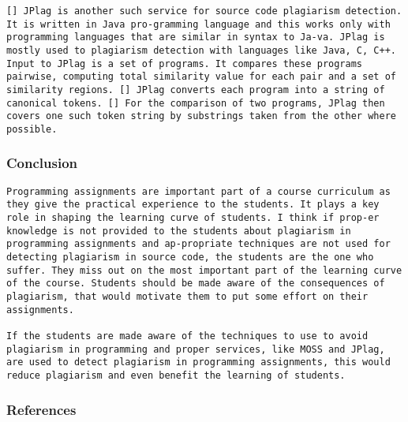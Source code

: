 \documentclass[a4paper]{article}
\begin{document}
\begin{verbatim}
[] JPlag is another such service for source code plagiarism detection. It is written in Java pro-gramming language and this works only with programming languages that are similar in syntax to Ja-va. JPlag is mostly used to plagiarism detection with languages like Java, C, C++. Input to JPlag is a set of programs. It compares these programs pairwise, computing total similarity value for each pair and a set of similarity regions. [] JPlag converts each program into a string of canonical tokens. [] For the comparison of two programs, JPlag then covers one such token string by substrings taken from the other where possible.
\end{verbatim}

\subsubsection{Conclusion}\label{conclusion}

\begin{verbatim}
Programming assignments are important part of a course curriculum as they give the practical experience to the students. It plays a key role in shaping the learning curve of students. I think if prop-er knowledge is not provided to the students about plagiarism in programming assignments and ap-propriate techniques are not used for detecting plagiarism in source code, the students are the one who suffer. They miss out on the most important part of the learning curve of the course. Students should be made aware of the consequences of plagiarism, that would motivate them to put some effort on their assignments.

If the students are made aware of the techniques to use to avoid plagiarism in programming and proper services, like MOSS and JPlag, are used to detect plagiarism in programming assignments, this would reduce plagiarism and even benefit the learning of students. 
\end{verbatim}

\subsubsection{References}\label{references}
\end{document}
